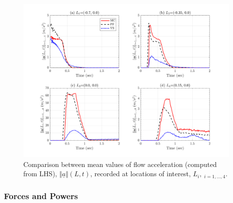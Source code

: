 \documentclass{article}
\begin{document}
\begin{figure}[H]
        \centering
        \includegraphics[width=1\textwidth]{InclinedPlane/Acceleration/accel_meanL.png}
        \caption{Comparison between mean values of flow acceleration (computed from LHS), $\Vert \underline{a} \Vert(L,t)$, recorded at locations of interest, $L_i, \ _{i=1,...,4}$.}
        \label{fig:Ramp-LM-AccL-means}
\end{figure}


\newpage
\subsubsection{Forces and Powers}
\end{document}
